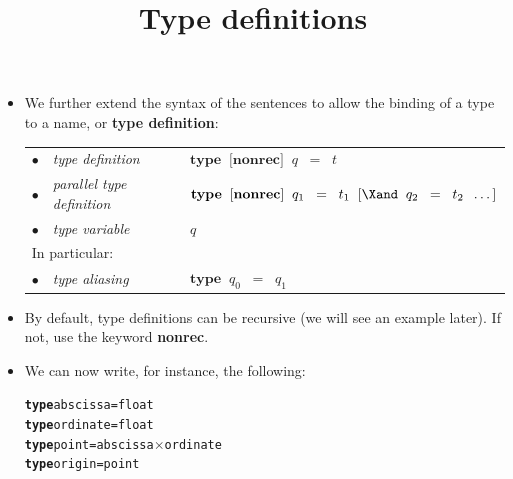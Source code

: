 \documentclass[wide]{slides}
\begin{document}
\begin{slide}
  \title{Type definitions}

  \begin{itemize}

    \item We further extend the syntax of the sentences to allow the
      binding of a type to a name, or \textbf{type definition}:\\
      \smallskip
      \begin{tabular}{@{\,}r@{\,\,}l@{\,\;}l@{}}
        $\bullet$
        & \emph{type definition}
        & \(\textbf{type} \;\; \textrm{[}\textbf{nonrec}\textrm{]}
        \;\; q \;\; = \;\; t\)\\
        $\bullet$
        & \emph{parallel type definition}
        & \(\textbf{type} \;\; \textrm{[}\textbf{nonrec}\textrm{]}
        \;\; q_1 \;\; = \;\; t_1 \;\; \textrm{[}\Xand \;\; q_2 \;\; =
          \;\; t_2 \;\; \ldots\textrm{]}\)\\
        $\bullet$
        & \emph{type variable}
        & $q$\\
        \multicolumn{2}{l}{In particular:}\\
        $\bullet$
        & \emph{type aliasing}
        & \(\textbf{type} \;\; q_0 \;\; = \;\; q_1\)
      \end{tabular}
      \smallskip

    \item By default, type definitions can be recursive (we will see
      an example later). If not, use the keyword \textbf{nonrec}.

    \item \noindent We can now write, for instance, the following:
\begin{alltt}
\textbf{type} abscissa = float
\textbf{type} ordinate = float
\textbf{type} point = abscissa \(\times\) ordinate
\textbf{type} origin = point
\end{alltt}

  \end{itemize}

\end{slide}
\end{document}
